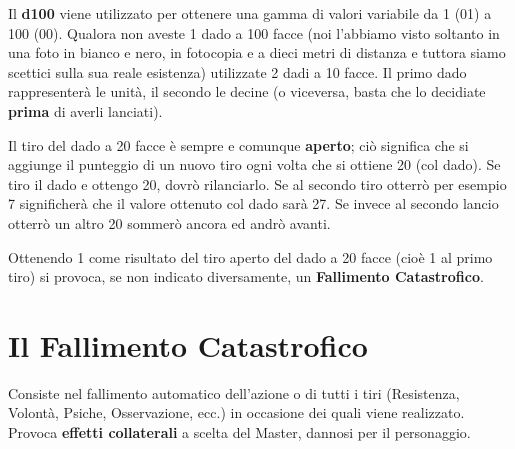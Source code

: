 Il \textbf{d100} viene utilizzato per ottenere una gamma di valori
variabile da 1 (01) a 100 (00). Qualora non aveste 1 dado a 100 facce
(noi l'abbiamo visto soltanto in una foto in bianco e nero, in
fotocopia e a dieci metri di distanza e tuttora siamo scettici sulla
sua reale esistenza) utilizzate 2 dadi a 10 facce. Il primo dado
rappresenter\`a le unit\`a, il secondo le decine (o viceversa, basta
che lo decidiate \textbf{prima} di averli lanciati).



Il tiro del dado a 20 facce \`e sempre e comunque \textbf{aperto};
ci\`o significa che si aggiunge il punteggio di un nuovo tiro ogni volta che
si ottiene 20 (col dado). Se tiro il dado e ottengo 20, dovr\`o
rilanciarlo. Se al secondo tiro otterr\`o per esempio 7
significher\`a che il valore ottenuto col dado sar\`a 27. Se invece al
secondo lancio otterr\`o un altro 20 sommer\`o ancora ed andr\`o
avanti.


Ottenendo 1 come risultato del tiro aperto del dado a 20 facce
(cio\`e 1 al primo tiro) si provoca, se non indicato diversamente,
un \textbf{Fallimento Catastrofico}.

{\raggedright \section{Il Fallimento Catastrofico}}
\label{fumble}

Consiste nel fallimento automatico dell'azione o di tutti i tiri
(Resistenza, Volont\`a, Psiche, Osservazione, ecc.) in occasione dei
quali viene realizzato. Provoca \textbf{effetti collaterali} a scelta
del Master, dannosi per il personaggio.

